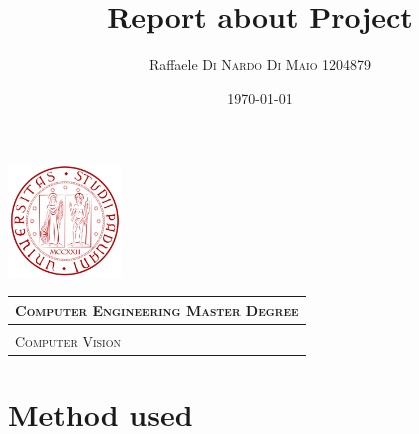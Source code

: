 \documentclass{article}
\title{\textbf{Report about Project}} %
\author{Raffaele \textsc{Di Nardo Di Maio} 1204879} %
\date{\today}
\begin{document}
\begin{minipage}{.20\textwidth}
  \includegraphics[height=3cm]{../Icon4}
\end{minipage}\begin{minipage}{.20\textwidth}
  \begin{table}[H]
  \begin{tabular}{l}
  \scshape{\Large{Computer Engineering Master Degree}} \\
  \hline \\
  \scshape{\Large{Computer Vision}} \\
  \end{tabular}
  \end{table}
\end{minipage}
{\let\newpage\relax\maketitle}

\section{Method used}
\end{document}
